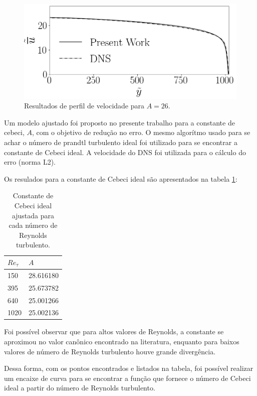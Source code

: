 \begin{figure}[!h]
\begin{minipage}[t]{0.5\textwidth}
	\end{minipage}
	\begin{minipage}[t]{0.45\textwidth}
		\centering
		\includegraphics[angle=0, scale=0.34]{fotos_formatacao_final/Temperature_1000_Avelocity}
	\end{minipage}	
	\caption{Resultados de perfil de velocidade para $A = 26$.}
	\label{figura_10}
\end{figure}

Um modelo ajustado foi proposto no presente trabalho para a constante de cebeci, $A$, com o objetivo de redução no erro. O mesmo algorítmo usado para se achar o número de prandtl turbulento ideal foi utilizado para se encontrar a constante de Cebeci ideal. A velocidade do DNS foi utilizada para o cálculo do erro (norma L2).

Os resulados para a constante de Cebeci ideal são apresentados na tabela \ref{tablea}:

\begin{table}[!h]
	\centering
	\caption{Constante de Cebeci ideal ajustada para cada número de Reynolds turbulento.}
	\begin{tabular}{ll}
		\hline
		$Re_\tau$ & $A$\\
		\hline
		150  &   28.616180\\
		395  &   25.673782\\
		640  &   25.001266\\
		1020 &   25.002136\\ 
		\hline
	\end{tabular}
	\label{tablea}
\end{table}

Foi possível observar que para altos valores de Reynolds, a constante se aproximou no valor canônico encontrado na literatura, enquanto para baixos valores de número de Reynolds turbulento houve grande divergência.

Dessa forma, com os pontos encontrados e listados na tabela, foi possível realizar um encaixe de curva para se encontrar a função que fornece o número de Cebeci ideal a partir do número de Reynolds turbulento.

